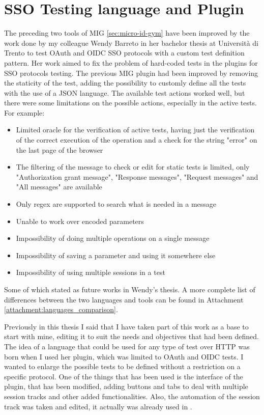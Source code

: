 \section{SSO Testing language and Plugin}
The preceding two tools of MIG \ref{sec:micro-id-gym} have been improved by the work done by my colleague Wendy Barreto \cite{wendy_barreto} in her bachelor thesis at Università di Trento to test \Gls{OAuth} and \Gls{OIDC} SSO protocols with a custom test definition pattern. Her work aimed to fix the problem of hard-coded tests in the plugins for SSO protocols testing. The previous MIG plugin had been improved by removing the staticity of the test, adding the possibility to customly define all the tests with the use of a JSON language.
The available test actions worked well, but there were some limitations on the possible actions, especially in the active tests. For example:
\begin{itemize}
    \item Limited oracle for the verification of active tests, having just the verification of the correct execution of the operation and a check for the string "error" on the last page of the browser
    \item The filtering of the message to check or edit for static tests is limited, only "Authorization grant message", "Response messages", "Request messages" and "All messages" are available
    \item Only regex are supported to search what is needed in a message
    \item Unable to work over encoded parameters
    \item Impossibility of doing multiple operations on a single message
    \item Impossibility of saving a parameter and using it somewhere else
    \item Impossibility of using multiple sessions in a test
\end{itemize}
Some of which stated as future works in Wendy's thesis. A more complete list of differences between the two languages and tools can be found in Attachment \ref{attachment:languages_comparison}.

Previously in this thesis I said that I have taken part of this work as a base to start with mine, editing it to suit the needs and objectives that had been defined. The idea of a language that could be used for any type of test over HTTP was born when I used her plugin, which was limited to \Gls{OAuth} and \Gls{OIDC} tests. I wanted to enlarge the possible tests to be defined without a restriction on a specific protocol. 
One of the things that has been used is the interface of the plugin, that has been modified, adding buttons and tabs to deal with multiple \gls{session track}s and other added functionalities. Also, the automation of the \gls{session track} was taken and edited, it actually was already used in \cite{claudio_grisenti,stefano_facchini}.

